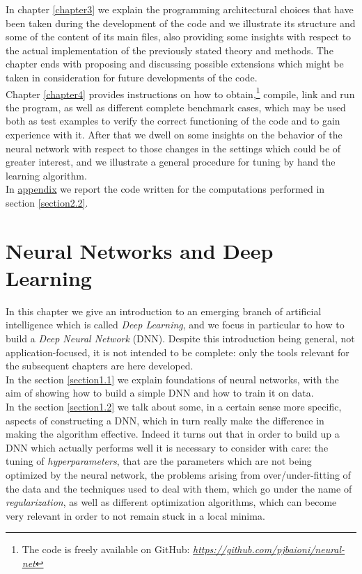 \documentclass[12pt, a4paper]{report}
\theoremstyle{definition}
\begin{document}
In chapter \ref{chapter3} we explain the programming architectural choices that have been taken during the development of the code and we illustrate its structure and some of the content of its main files, also providing some insights with respect to the actual implementation of the previously stated theory and methods. The chapter ends with proposing and discussing possible extensions which might be taken in consideration for future developments of the code.\\
Chapter \ref{chapter4} provides instructions on how to obtain,\footnote{The code is freely available on GitHub: \href{https://github.com/pjbaioni/neural-net}{\emph{https://github.com/pjbaioni/neural-net}}} compile, link and run the program, as well as different complete benchmark cases, which may be used both as test examples to verify the correct functioning of the code and to gain experience with it. After that we dwell on some insights on the behavior of the neural network with respect to those changes in the settings which could be of greater interest, and we illustrate a general procedure for tuning by hand the learning algorithm.\\
In \hyperref[appendix]{appendix} we report the \cite{freefem++} code written for the computations performed in section \ref{section2.2}.




\chapter{Neural Networks and Deep Learning}\label{chapter1}
In this chapter we give an introduction to an emerging branch of artificial intelligence which is called \textit{Deep Learning}, and we focus in particular to how to build a \textit{Deep Neural Network} (DNN). Despite this introduction being general, not application-focused, it is not intended to be complete: only the tools relevant for the subsequent chapters are here developed.\\
In the section \ref{section1.1} we explain foundations of neural networks, with the aim of showing how to build a simple DNN and how to train it on data.\\
In the section \ref{section1.2} we talk about some, in a certain sense more specific, aspects of constructing a DNN, which in turn really make the difference in making the algorithm effective. Indeed it turns out that in order to build up a DNN which actually performs well it is necessary to consider with care: the tuning of \textit{hyperparameters}, that are the parameters which are not being optimized by the neural network, the problems arising from over/under-fitting of the data and the techniques used to deal with them, which go under the name of \textit{regularization}, as well as different optimization algorithms, which can become very relevant in order to not remain stuck in a local minima.\\
\newpage
\end{document}
